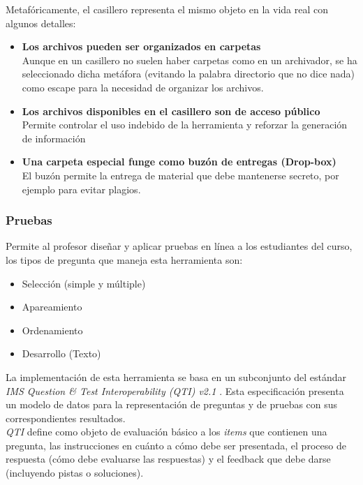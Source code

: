 Metafóricamente, el casillero representa el mismo objeto en la vida real con algunos detalles:
\begin{itemize}
	\item \textbf{Los archivos pueden ser organizados en carpetas}\\
	Aunque en un casillero no suelen haber carpetas como en un archivador, se ha seleccionado dicha metáfora (evitando la palabra directorio que no dice nada) como escape para la necesidad de organizar los archivos.
	\item \textbf{Los archivos disponibles en el casillero son de acceso público} \\
	Permite controlar el uso indebido de la herramienta y reforzar la generación de información
	\item \textbf{Una carpeta especial funge como buzón de entregas (Drop-box)}\\
	El buzón permite la entrega de material que debe mantenerse secreto, por ejemplo para evitar plagios.
\end{itemize}

\subsubsection{Pruebas}
Permite al profesor diseñar y aplicar pruebas en línea a los estudiantes del curso, los tipos de pregunta que maneja esta herramienta son:

\begin{itemize}
	\item Selección (simple y múltiple)
	\item Apareamiento
	\item Ordenamiento
	\item Desarrollo (Texto)
\end{itemize}

La implementación de esta herramienta se basa en un subconjunto del estándar \emph{IMS Question \& Test Interoperability (QTI) v2.1} \citep{IMP_QTI2008}. Esta especificación presenta un modelo de datos para la representación de preguntas y de pruebas con sus correspondientes resultados.\\

\emph{QTI} define como objeto de evaluación básico a los \emph{items} que contienen una pregunta, las instrucciones en cuánto a cómo debe ser presentada, el proceso de respuesta (cómo debe evaluarse las respuestas) y el feedback que debe darse (incluyendo pistas o soluciones). \\

